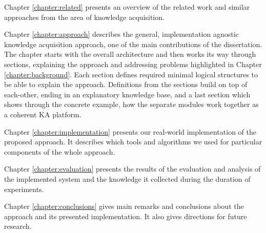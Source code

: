 Chapter \ref{chapter:related} presents an overview of the related work and
similar approaches from the area of knowledge acquisition.

Chapter \ref{chapter:approach} describes the general, implementation agnostic
knowledge acquisition approach, one of the main contributions of the dissertation.
The chapter starts with the overall architecture and then works its way through
sections, explaining the approach and addressing problems highlighted in
Chapter \ref{chapter:background}. Each section defines required minimal logical
structures to be able to explain the approach. Definitions from the sections
build on top of each-other, ending in an explanatory knowledge base, and
a last section which shows through the concrete example, how the separate 
modules work together as a coherent KA platform.

Chapter \ref{chapter:implementation} presents our real-world implementation of 
the proposed approach. It describes which tools and algorithms we used for 
particular components of the whole approach.

Chapter \ref{chapter:evaluation} presents the results of the evaluation and
analysis of the implemented system and the knowledge it collected during the
duration of experiments.

Chapter \ref{chapter:conclusions} gives main remarks and conclusions about the
approach and its presented implementation. It also gives directions for future
research.
